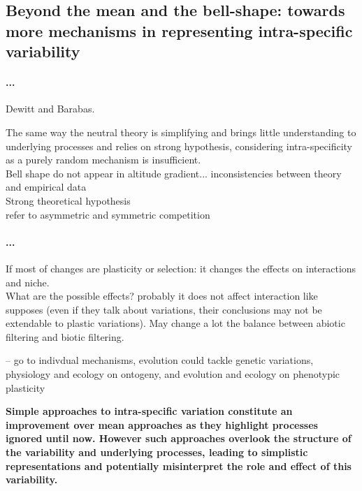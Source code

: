 \subsection{Beyond the mean and the bell-shape: towards more mechanisms in representing intra-specific variability}

\paragraph{...}
Dewitt and Barabas.

The same way the neutral theory is simplifying and brings little understanding to underlying processes and relies on strong hypothesis, considering intra-specificity as a purely random mechanism is insufficient.\\
Bell shape do not appear in altitude gradient... inconsistencies between theory and empirical data\\
Strong theoretical hypothesis\\
refer to asymmetric and symmetric competition\\

\paragraph{...}
If most of changes are plasticity or selection: it changes the effects on interactions and niche.\\
What are the possible effects? probably it does not affect interaction like \parencite{hart_how_2016} supposes (even if they talk about variations, their conclusions may not be extendable to plastic variations). May change a lot the balance between abiotic filtering and biotic filtering. 

-- go to indivdual mechanisms, evolution could tackle genetic variations, physiology and ecology on ontogeny, and evolution and ecology on phenotypic plasticity


\textbf{Simple approaches to intra-specific variation constitute an improvement over mean approaches as they highlight processes ignored until now. However such approaches overlook the structure of the variability and underlying processes, leading to simplistic representations and potentially misinterpret the role and effect of this variability.}


